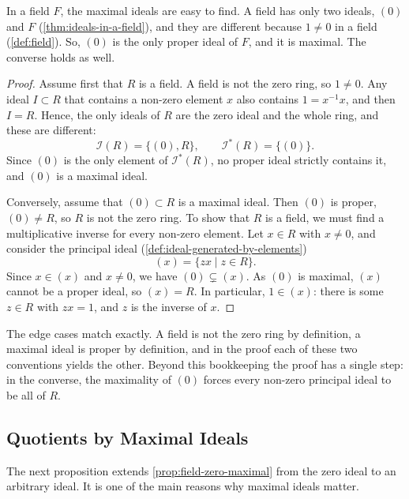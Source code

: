 In a field $F$, the maximal ideals are easy to find. A field has only two ideals, $(0)$ and $F$ (\cref{thm:ideals-in-a-field}), and they are different because $1 \neq 0$ in a field (\cref{def:field}). So, $(0)$ is the only proper ideal of $F$, and it is maximal. The converse holds as well.


\begin{proof}
Assume first that $R$ is a field. A field is not the zero ring, so $1 \neq 0$. Any ideal $I \subset R$ that contains a non-zero element $x$ also contains $1 = x^{-1} x$, and then $I = R$. Hence, the only ideals of $R$ are the zero ideal and the whole ring, and these are different:
\[
\mathscr{I}(R) = \{ (0), R \}, \qquad \mathscr{I}^*(R) = \{ (0) \}.
\]
Since $(0)$ is the only element of $\mathscr{I}^*(R)$, no proper ideal strictly contains it, and $(0)$ is a maximal ideal.

Conversely, assume that $(0) \subset R$ is a maximal ideal. Then $(0)$ is proper, $(0) \neq R$, so $R$ is not the zero ring. To show that $R$ is a field, we must find a multiplicative inverse for every non-zero element. Let $x \in R$ with $x \neq 0$, and consider the principal ideal (\cref{def:ideal-generated-by-elements})
\[
(x) = \{ z x \mid z \in R \}.
\]
Since $x \in (x)$ and $x \neq 0$, we have $(0) \subsetneq (x)$. As $(0)$ is maximal, $(x)$ cannot be a proper ideal, so $(x) = R$. In particular, $1 \in (x)$: there is some $z \in R$ with $z x = 1$, and $z$ is the inverse of $x$.
\end{proof}

The edge cases match exactly. A field is not the zero ring by definition, a maximal ideal is proper by definition, and in the proof each of these two conventions yields the other. Beyond this bookkeeping the proof has a single step: in the converse, the maximality of $(0)$ forces every non-zero principal ideal to be all of $R$.

\subsection{Quotients by Maximal Ideals}

The next proposition extends \cref{prop:field-zero-maximal} from the zero ideal to an arbitrary ideal. It is one of the main reasons why maximal ideals matter.

